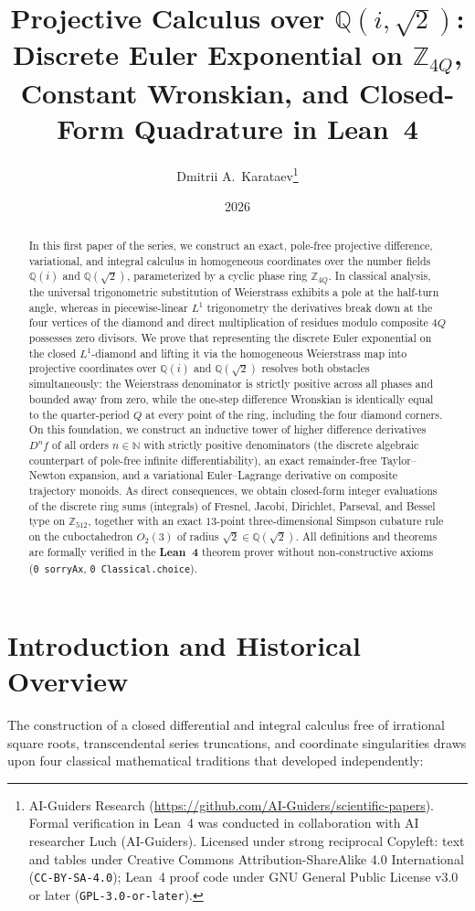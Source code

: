 \documentclass[11pt,a4paper]{article}
\title{\textbf{Projective Calculus over $\mathbb{Q}(i,\sqrt{2})$:\\ Discrete Euler Exponential on $\mathbb{Z}_{4Q}$, Constant Wronskian, and Closed-Form Quadrature in Lean~4}}
\author{Dmitrii A.~Karataev\thanks{AI-Guiders Research (\url{https://github.com/AI-Guiders/scientific-papers}). Formal verification in Lean~4 was conducted in collaboration with AI researcher Luch (AI-Guiders). Licensed under strong reciprocal Copyleft: text and tables under Creative Commons Attribution-ShareAlike 4.0 International (\texttt{CC-BY-SA-4.0}); Lean~4 proof code under GNU General Public License v3.0 or later (\texttt{GPL-3.0-or-later}).}}
\date{2026}
\theoremstyle{plain}
\theoremstyle{definition}
\begin{document}
\maketitle

\begin{abstract}
In this first paper of the series, we construct an exact, pole-free projective difference, variational, and integral calculus in homogeneous coordinates over the number fields $\mathbb{Q}(i)$ and $\mathbb{Q}(\sqrt{2})$, parameterized by a cyclic phase ring $\mathbb{Z}_{4Q}$. In classical analysis, the universal trigonometric substitution of Weierstrass exhibits a pole at the half-turn angle, whereas in piecewise-linear $L^1$ trigonometry the derivatives break down at the four vertices of the diamond and direct multiplication of residues modulo composite $4Q$ possesses zero divisors. We prove that representing the discrete Euler exponential on the closed $L^1$-diamond and lifting it via the homogeneous Weierstrass map into projective coordinates over $\mathbb{Q}(i)$ and $\mathbb{Q}(\sqrt{2})$ resolves both obstacles simultaneously: the Weierstrass denominator is strictly positive across all phases and bounded away from zero, while the one-step difference Wronskian is identically equal to the quarter-period $Q$ at every point of the ring, including the four diamond corners. On this foundation, we construct an inductive tower of higher difference derivatives $D^n f$ of all orders $n \in \mathbb{N}$ with strictly positive denominators (the discrete algebraic counterpart of pole-free infinite differentiability), an exact remainder-free Taylor--Newton expansion, and a variational Euler--Lagrange derivative on composite trajectory monoids. As direct consequences, we obtain closed-form integer evaluations of the discrete ring sums (integrals) of Fresnel, Jacobi, Dirichlet, Parseval, and Bessel type on $\mathbb{Z}_{512}$, together with an exact $13$-point three-dimensional Simpson cubature rule on the cuboctahedron $O_2(3)$ of radius $\sqrt{2} \in \mathbb{Q}(\sqrt{2})$. All definitions and theorems are formally verified in the \textbf{Lean~4} theorem prover without non-constructive axioms (\texttt{0 sorryAx}, \texttt{0 Classical.choice}).
\end{abstract}

\section{Introduction and Historical Overview}
\label{sec:intro}

The construction of a closed differential and integral calculus free of irrational square roots, transcendental series truncations, and coordinate singularities draws upon four classical mathematical traditions that developed independently:
\end{document}

